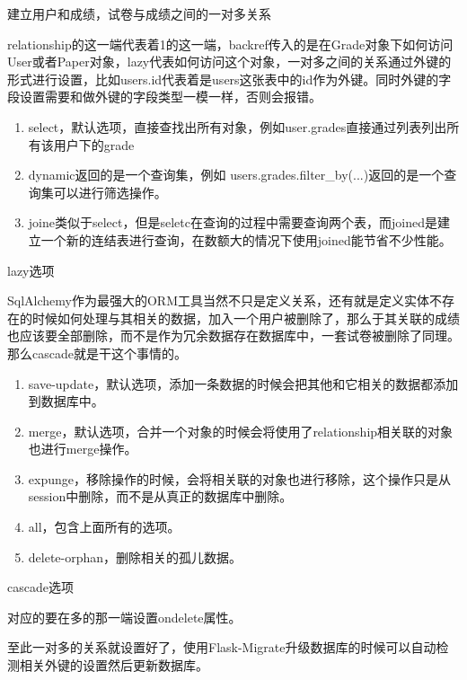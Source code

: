 \begin{center}
	{\small 建立用户和成绩，试卷与成绩之间的一对多关系}
\end{center}

relationship的这一端代表着1的这一端，backref传入的是在Grade对象下如何访问User或者Paper对象，lazy代表如何访问这个对象，一对多之间的关系通过外键的形式进行设置，比如users.id代表着是users这张表中的id作为外键。同时外键的字段设置需要和做外键的字段类型一模一样，否则会报错。

\begin{enumerate}
\item select，默认选项，直接查找出所有对象，例如user.grades直接通过列表列出所有该用户下的grade
\item dynamic返回的是一个查询集，例如 users.grades.filter\_by(...)返回的是一个查询集可以进行筛选操作。
\item joine类似于select，但是seletc在查询的过程中需要查询两个表，而joined是建立一个新的连结表进行查询，在数额大的情况下使用joined能节省不少性能。
\end{enumerate}

\begin{center}
	{\small lazy选项}
\end{center}

SqlAlchemy作为最强大的ORM工具当然不只是定义关系，还有就是定义实体不存在的时候如何处理与其相关的数据，加入一个用户被删除了，那么于其关联的成绩也应该要全部删除，而不是作为冗余数据存在数据库中，一套试卷被删除了同理。那么cascade就是干这个事情的。

\begin{enumerate}
\item save-update，默认选项，添加一条数据的时候会把其他和它相关的数据都添加到数据库中。
\item merge，默认选项，合并一个对象的时候会将使用了relationship相关联的对象也进行merge操作。
\item expunge，移除操作的时候，会将相关联的对象也进行移除，这个操作只是从session中删除，而不是从真正的数据库中删除。
\item all，包含上面所有的选项。
\item delete-orphan，删除相关的孤儿数据。
\label{cascade选项}
\end{enumerate}

\begin{center}
	{\small cascade选项}
\end{center}

对应的要在多的那一端设置ondelete属性。

至此一对多的关系就设置好了，使用Flask-Migrate升级数据库的时候可以自动检测相关外键的设置然后更新数据库。

